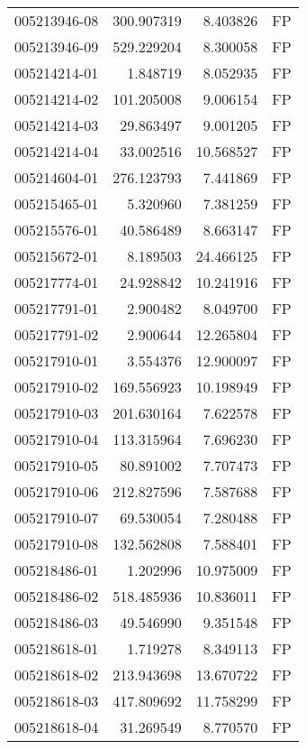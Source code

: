 \begin{tabular}{lrrl}
005213946-08 &  300.907319 &       8.403826 &   FP \\
005213946-09 &  529.229204 &       8.300058 &   FP \\
005214214-01 &    1.848719 &       8.052935 &   FP \\
005214214-02 &  101.205008 &       9.006154 &   FP \\
005214214-03 &   29.863497 &       9.001205 &   FP \\
005214214-04 &   33.002516 &      10.568527 &   FP \\
005214604-01 &  276.123793 &       7.441869 &   FP \\
005215465-01 &    5.320960 &       7.381259 &   FP \\
005215576-01 &   40.586489 &       8.663147 &   FP \\
005215672-01 &    8.189503 &      24.466125 &   FP \\
005217774-01 &   24.928842 &      10.241916 &   FP \\
005217791-01 &    2.900482 &       8.049700 &   FP \\
005217791-02 &    2.900644 &      12.265804 &   FP \\
005217910-01 &    3.554376 &      12.900097 &   FP \\
005217910-02 &  169.556923 &      10.198949 &   FP \\
005217910-03 &  201.630164 &       7.622578 &   FP \\
005217910-04 &  113.315964 &       7.696230 &   FP \\
005217910-05 &   80.891002 &       7.707473 &   FP \\
005217910-06 &  212.827596 &       7.587688 &   FP \\
005217910-07 &   69.530054 &       7.280488 &   FP \\
005217910-08 &  132.562808 &       7.588401 &   FP \\
005218486-01 &    1.202996 &      10.975009 &   FP \\
005218486-02 &  518.485936 &      10.836011 &   FP \\
005218486-03 &   49.546990 &       9.351548 &   FP \\
005218618-01 &    1.719278 &       8.349113 &   FP \\
005218618-02 &  213.943698 &      13.670722 &   FP \\
005218618-03 &  417.809692 &      11.758299 &   FP \\
005218618-04 &   31.269549 &       8.770570 &   FP \\

\end{tabular}
